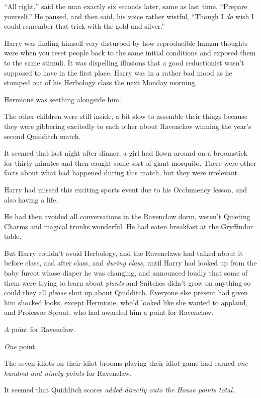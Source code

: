 “All right,” said the man exactly six seconds later, same as last time.
“Prepare yourself.” He paused, and then said, his voice rather wistful, “Though
I \emph{do} wish I could remember that trick with the gold and silver.”

Harry was finding himself very disturbed by how reproducible human thoughts
were when you reset people back to the same initial conditions and exposed them
to the same stimuli. It was dispelling illusions that a good reductionist
wasn’t supposed to have in the first place.
\later
Harry was in a rather bad mood as he stomped out of his Herbology class the
next Monday morning.

Hermione was seething alongside him.

The other children were still inside, a bit slow to assemble their things
because they were gibbering excitedly to each other about Ravenclaw winning the
year’s second Quidditch match.

It seemed that last night after dinner, a girl had flown around on a broomstick
for thirty minutes and then caught some sort of giant mosquito. There were
other facts about what had happened during this match, but they were irrelevant.

Harry had missed this exciting sports event due to his Occlumency lesson, and
also having a life.

He had then avoided all conversations in the Ravenclaw dorm, weren’t Quieting
Charms and magical trunks wonderful. He had eaten breakfast at the Gryffindor
table.

But Harry couldn’t avoid Herbology, and the Ravenclaws had talked about it
before class, and after class, and \emph{during class,} until Harry had looked
up from the baby furcot whose diaper he was changing, and announced loudly that
some of them were trying to learn about \emph{plants} and Snitches didn’t grow
on anything so could they all \emph{please} shut up about Quidditch. Everyone
else present had given him shocked looks, except Hermione, who’d looked like
she wanted to applaud, and Professor Sprout, who had awarded him a point for
Ravenclaw.

\emph{A} point for Ravenclaw.

\emph{One} point.

The seven idiots on their idiot brooms playing their idiot game had earned
\emph{one hundred and ninety points} for Ravenclaw.

It seemed that Quidditch scores \emph{added directly onto the House points
total.}

